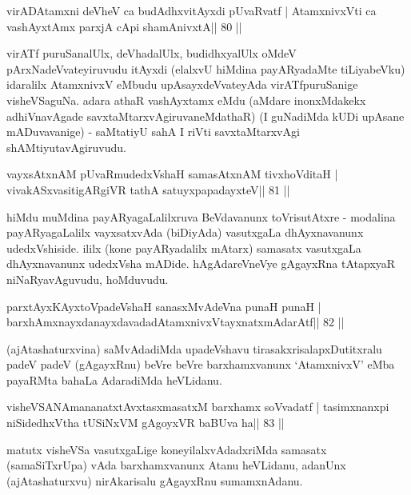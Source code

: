 
\begin{shl}
virADAtamxni deVheV ca budAdhxvitAyxdi pUvaRvatf |
AtamxnivxVti ca vashAyxtAmx parxjA cApi shamAnivxtA\hfill || 80 ||
\end{shl}

\begin{artha}
virATf puruSanalUlx, deVhadalUlx, budidhxyalUlx oMdeV  pArxNadeVvateyiruvudu itAyxdi (elalxvU hiMdina payARyadaMte  tiLiyabeVku) idaralilx AtamxnivxV eMbudu upAsayxdeVvateyAda  virATfpuruSanige visheVSaguNa. adara athaR vashAyxtamx eMdu (aMdare  inonxMdakekx adhiVnavAgade savxtaMtarxvAgiruvaneMdathaR) (I guNadiMda kUDi upAsane mADuvavanige) - saMtatiyU sahA I riVti savxtaMtarxvAgi shAMtiyutavAgiruvudu.
\end{artha}

\begin{shl}
vayxsAtxnAM pUvaRmudedxVshaH samasAtxnAM tivxhoVditaH |
vivakASxvasitigARgiVR tathA satuyxpapadayxteV\hfill || 81 ||
\end{shl}

\begin{artha}
hiMdu muMdina payARyagaLalilxruva BeVdavanunx toVrisutAtxre - modalina  payARyagaLalilx vayxsatxvAda (biDiyAda) vasutxgaLa dhAyxnavanunx  udedxVshiside. ililx (kone payARyadalilx mAtarx) samasatx vasutxgaLa  dhAyxnavanunx udedxVsha mADide. hAgAdareVneVye gAgayxRna tAtapxyaR niNaRyavAguvudu, hoMduvudu.
\end{artha}

\begin{shl}
parxtAyxKAyxtoVpadeVshaH sanasxMvAdeVna punaH punaH |
barxhAmxnayxdanayxdavadadAtamxnivxVtayxnatxmAdarAtf\hfill || 82 ||
\end{shl}

\begin{artha}
(ajAtashaturxvina) saMvAdadiMda upadeVshavu tirasakxrisalapxDutitxralu padeV padeV (gAgayxRnu) beVre beVre barxhamxvanunx `AtamxnivxV' eMba payaRMta bahaLa AdaradiMda heVLidanu.
\end{artha}

\begin{shl}
visheVSANAmananatxtAvxtasxmasatxM barxhamx soV\s vadatf |
tasimxnanxpi niSidedhxV\s tha tUSiNxVM gAgoyxVR baBUva ha\hfill || 83 ||
\end{shl}

\begin{artha}
matutx visheVSa vasutxgaLige koneyilalxvAdadxriMda samasatx  (samaSiTxrUpa) vAda barxhamxvanunx Atanu heVLidanu, adanUnx (ajAtashaturxvu) nirAkarisalu gAgayxRnu sumamxnAdanu.
\end{artha}

